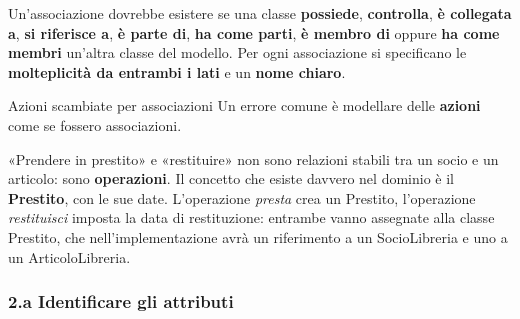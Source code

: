 Un'associazione dovrebbe esistere se una classe \textbf{possiede}, \textbf{controlla}, \textbf{è collegata a}, \textbf{si
riferisce a}, \textbf{è parte di}, \textbf{ha come parti}, \textbf{è membro di} oppure \textbf{ha come membri} un'altra classe
del modello. Per ogni associazione si specificano le \textbf{molteplicità da entrambi i lati} e un \textbf{nome chiaro}.

\begin{esempio}{Azioni scambiate per associazioni}
Un errore comune è modellare delle \textbf{azioni} come se fossero associazioni.
\begin{center}
\end{center}
«Prendere in prestito» e «restituire» non sono relazioni stabili tra un socio e un articolo: sono \textbf{operazioni}. Il concetto
che esiste davvero nel dominio è il \textbf{Prestito}, con le sue date. L'operazione \textit{presta} crea un Prestito,
l'operazione \textit{restituisci} imposta la data di restituzione: entrambe vanno assegnate alla classe Prestito, che
nell'implementazione avrà un riferimento a un SocioLibreria e uno a un ArticoloLibreria.
\end{esempio}

\subsubsection*{2.a Identificare gli attributi}

